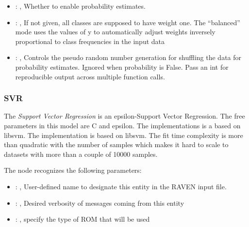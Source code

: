 \begin{itemize}
    \item {}: , 
      Whether to enable probability estimates.

    \item {}: \xmlDesc{[balanced]}, 
      If not given, all classes are supposed to have weight one.
      The “balanced” mode uses the values of y to automatically adjust weights
      inversely proportional to class frequencies in the input data

    \item {}: , 
      Controls the pseudo random number generation for shuffling
      the data for probability estimates. Ignored when probability is False.
      Pass an int for reproducible output across multiple function calls.
  \end{itemize}


\subsubsection{SVR}
  The  \textit{Support Vector Regression} is an epsilon-Support Vector Regression.
  The free parameters in this model are C and epsilon. The implementations is a based on libsvm.
  The implementation is based on libsvm. The fit time complexity                             is more
  than quadratic with the number of samples which makes it hard                             to scale
  to datasets with more than a couple of 10000 samples.

  The  node recognizes the following parameters:
    \begin{itemize}
      \item {}: , 
        User-defined name to designate this entity in the RAVEN input file.
      \item {}: , 
        Desired verbosity of messages coming from this entity
      \item {}: , 
        specify the type of ROM that will be used
  \end{itemize}

